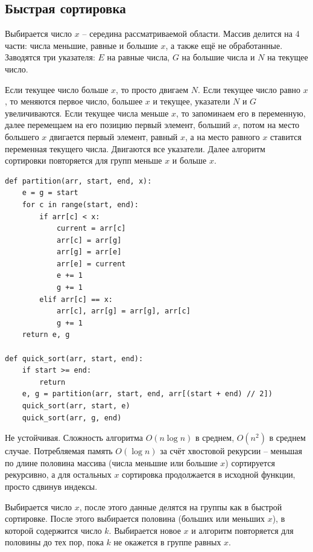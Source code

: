 \documentclass[12pt]{article}
\begin{document}
\subsection{Быстрая сортировка}

\begin{algorithm}
	Выбирается число $x$ -- середина рассматриваемой области. Массив
	делится на 4 части: числа меньшие, равные и большие $x$, а также ещё
	не обработанные. Заводятся три указателя: $E$ на равные числа, $G$
	на большие числа и $N$ на
	текущее число.\par

	Если текущее число больше $x$, то просто двигаем $N$. Если текущее
	число равно $x$, то меняются первое число, большее $x$ и текущее,
	указатели $N$ и $G$ увеличиваются. Если текущее числа меньше $x$, то
	запоминаем его в переменную, далее перемещаем на его позицию первый
	элемент, больший $x$, потом на место большего $x$ двигается первый
	элемент, равный $x$, а на место равного $x$ ставится переменная
	текущего числа. Двигаются все указатели. Далее алгоритм сортировки
	повторяется для групп меньше $x$ и больше $x$.
	\begin{verbatim}
def partition(arr, start, end, x):
    e = g = start
    for c in range(start, end):
        if arr[c] < x:
            current = arr[c]
            arr[c] = arr[g]
            arr[g] = arr[e]
            arr[e] = current
            e += 1
            g += 1
        elif arr[c] == x:
            arr[c], arr[g] = arr[g], arr[c]
            g += 1
    return e, g

def quick_sort(arr, start, end):
    if start >= end:
        return
    e, g = partition(arr, start, end, arr[(start + end) // 2])
    quick_sort(arr, start, e)
    quick_sort(arr, g, end)
	\end{verbatim}
	Не устойчивая. Сложность алгоритма $O(n\log n)$ в среднем, $O(n^2)$ в среднем
	случае. Потребляемая память $O(\log n)$ за счёт хвостовой рекурсии
	-- меньшая по длине половина массива (числа меньшие или большие $x$)
	сортируется рекурсивно, а для
	остальных $x$ сортировка продолжается в исходной функции, просто
	сдвинув индексы.
\end{algorithm}
\begin{algorithm}
	Выбирается число $x$, после этого данные делятся на группы как в
	быстрой сортировке. После этого выбирается половина (больших или
	меньших $x$), в которой содержится число $k$. Выбирается новое $x$ и
	алгоритм повторяется для половины до тех пор, пока $k$ не окажется в
	группе равных $x$.
\end{algorithm}
\end{document}
